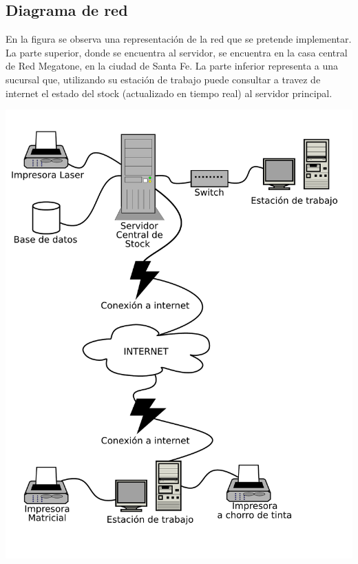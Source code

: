\subsection{Diagrama de red}
En la figura se observa una representación de la red que se pretende implementar. La parte superior, donde se encuentra al servidor, se encuentra en la casa central de Red Megatone, en la ciudad de Santa Fe. La parte inferior representa a una sucursal que, utilizando su estación de trabajo puede consultar a travez de internet el estado del stock (actualizado en tiempo real) al servidor principal.

\includegraphics[width=\textwidth]{fase2/diagrama_red/diagrama_red.pdf}

